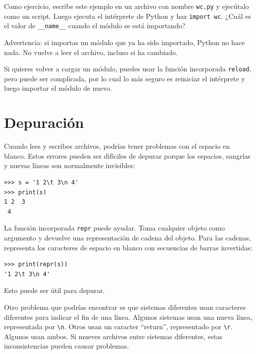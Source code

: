 \documentclass[10pt]{book}
\begin{document}

Como ejercicio, escribe este ejemplo en un archivo con nombre {\tt wc.py} y ejecútalo
como un script.  Luego ejecuta el intérprete de Python y
haz {\tt import wc}.  ¿Cuál es el valor de \verb"__name__"
cuando el módulo se está importando?

Advertencia: si importas un módulo que ya ha sido importado,
Python no hace nada.  No vuelve a leer el archivo, incluso si ha
cambiado.

Si quieres volver a cargar un módulo, puedes usar la función incorporada
{\tt reload}, pero puede ser complicada, por lo cual lo más seguro es
reiniciar el intérprete y luego importar el módulo de nuevo.


\section{Depuración}

Cuando lees y escribes archivos, podrías tener problemas
con el espacio en blanco.  Estos errores pueden ser difíciles de depurar porque los espacios,
sangrías y nuevas líneas son normalmente invisibles:

\begin{verbatim}
>>> s = '1 2\t 3\n 4'
>>> print(s)
1 2	 3
 4
\end{verbatim}

La función incorporada {\tt repr} puede ayudar.  Toma cualquier objeto como
argumento y devuelve una representación de cadena del objeto.  Para
las cadenas, representa los caracteres de
espacio en blanco con secuencias de barras invertidas:

\begin{verbatim}
>>> print(repr(s))
'1 2\t 3\n 4'
\end{verbatim}

Esto puede ser útil para depurar.

Otro problema que podrías encontrar es que sistemas diferentes
usan caracteres diferentes para indicar el fin de una línea.  Algunos
sistemas usan una nueva línea, representada por \verb"\n".  Otros usan
un caracter ``return'', representado por \verb"\r".  Algunos usan ambos.
Si mueves archivos entre sistemas diferentes, estas inconsistencias
pueden causar problemas.
\end{document}
